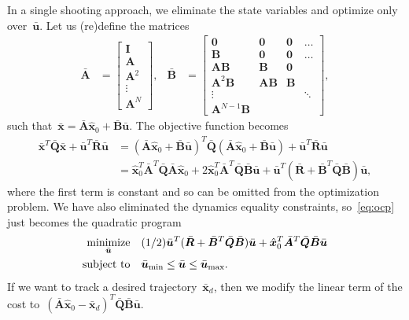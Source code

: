 \documentclass{article}
\begin{document}
In a single shooting approach, we eliminate the state variables and optimize
only over~$\bar{\bm{u}}$. Let us (re)define the matrices
\begin{align*}
  \bar{\bm{A}} &= \begin{bmatrix} \bm{I} \\ \bm{A} \\ \bm{A}^2 \\ \vdots \\ \bm{A}^{N} \end{bmatrix}, &
  \bar{\bm{B}} &= \begin{bmatrix}
    \bm{0} & \bm{0} & \bm{0} & \hdots \\
    \bm{B} & \bm{0} & \bm{0} & \hdots \\
    \bm{A}\bm{B} & \bm{B} & \bm{0} \\
    \bm{A}^{2}\bm{B} & \bm{A}\bm{B} & \bm{B} \\
    \vdots & & & \ddots \\ \bm{A}^{N-1}\bm{B}
  \end{bmatrix},
\end{align*}
such that~$\bar{\bm{x}}=\bar{\bm{A}}\hat{\bm{x}}_0 + \bar{\bm{B}}\bar{\bm{u}}$.
The objective function becomes
\begin{equation*}
  \begin{aligned}
    \bar{\bm{x}}^T\bar{\bm{Q}}\bar{\bm{x}} + \bar{\bm{u}}^T\bar{\bm{R}}\bar{\bm{u}} &= (\bar{\bm{A}}\hat{\bm{x}}_0 + \bar{\bm{B}}\bar{\bm{u}})^T\bar{\bm{Q}}(\bar{\bm{A}}\hat{\bm{x}}_0 + \bar{\bm{B}}\bar{\bm{u}}) + \bar{\bm{u}}^T\bar{\bm{R}}\bar{\bm{u}} \\
                                                                                    &= \hat{\bm{x}}_0^T\bar{\bm{A}}^T\bar{\bm{Q}}\bar{\bm{A}}\hat{\bm{x}}_0 + 2\hat{\bm{x}}_0^T\bar{\bm{A}}^T\bar{\bm{Q}}\bar{\bm{B}}\bar{\bm{u}} + \bar{\bm{u}}^T(\bar{\bm{R}}+\bar{\bm{B}}^T\bar{\bm{Q}}\bar{\bm{B}})\bar{\bm{u}},
  \end{aligned}
\end{equation*}
where the first term is constant and so can be omitted from the optimization
problem. We have also eliminated the dynamics equality constraints,
so~\eqref{eq:ocp} just becomes the quadratic program
\begin{equation}\label{eq:mpc_ss}
  \begin{aligned}
    \operatorname*{minimize}_{\bar{\bm{u}}} &\quad (1/2)\bar{\bm{u}}^T(\bar{\bm{R}}+\bar{\bm{B}}^T\bar{\bm{Q}}\bar{\bm{B}})\bar{\bm{u}} + \hat{\bm{x}}_0^T\bar{\bm{A}}^T\bar{\bm{Q}}\bar{\bm{B}}\bar{\bm{u}} \\
    \text{subject to} &\quad \bar{\bm{u}}_{\min} \leq \bar{\bm{u}} \leq \bar{\bm{u}}_{\max}.
  \end{aligned}
\end{equation}
If we want to track a desired trajectory~$\bar{\bm{x}}_d$, then we modify the
linear term of the cost
to~$(\bar{\bm{A}}\hat{\bm{x}}_0-\bar{\bm{x}}_d)^T\bar{\bm{Q}}\bar{\bm{B}}\bar{\bm{u}}$.
\end{document}

